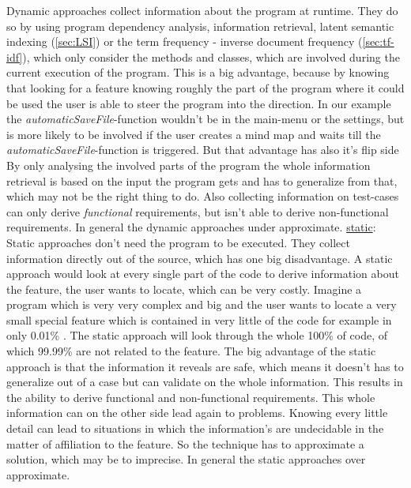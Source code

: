 Dynamic approaches collect information about the program at runtime. They do so by using program dependency analysis, information retrieval, latent semantic indexing (\autoref{sec:LSI}) or the term frequency - inverse document frequency {(\autoref{sec:tf-idf}), which only consider the methods and classes, which are involved during the current execution of the program. This is a big advantage, because by knowing that looking for a feature knowing roughly the part of the program where it could be used the user is able to steer the program into the direction. In our example the \emph{automaticSaveFile}-function wouldn't be in the main-menu or the settings, but is more likely to be involved if the user creates a mind map and waits till the \emph{automaticSaveFile}-function is triggered. But that advantage has also it's flip side By only analysing the involved parts of the program the whole information retrieval is based on the input the program gets and has to generalize from that, which may not be the right thing to do. Also collecting information on test-cases can only derive \emph{functional} requirements, but isn't able to derive non-functional requirements. In general the dynamic approaches under approximate.\newline
\underline{static}:\newline
Static approaches don't need the program to be executed. They collect information directly out of the source, which has  one big disadvantage. A static approach would look at every single part of the code to derive information about the feature, the user wants to locate, which can be very costly. Imagine a program which is very very complex and big and the user wants to locate a very small special feature which is contained in very little of the code for example in only 0.01\% . The static approach will look through the whole 100\% of code, of which 99.99\% are not related to the feature. The big advantage of the static approach is that the information it reveals are safe, which means it doesn't has to generalize out of a case but can validate on the whole information. This results in the ability to derive functional and non-functional requirements. This whole information can on the other side lead again to problems. Knowing every little detail can lead to situations in which the information's are undecidable in the matter of affiliation to the feature. So the technique has to approximate a solution, which may be to imprecise. In general the static approaches over approximate. \newline
\\
}
